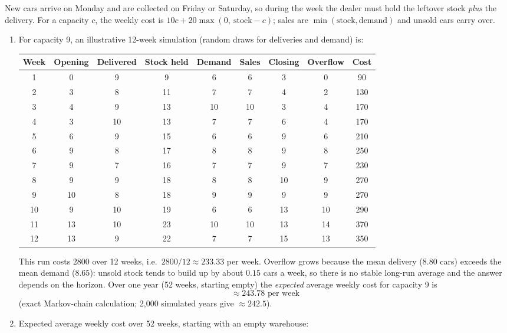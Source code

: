 \documentclass[11pt,a4paper]{article}
\begin{document}
New cars arrive on Monday and are collected on Friday or Saturday, so during the week the dealer must hold the leftover stock \emph{plus} the delivery. For a capacity $c$, the weekly cost is $10c + 20\max(0,\ \text{stock}-c)$; sales are $\min(\text{stock},\text{demand})$ and unsold cars carry over.

\begin{enumerate}
\item For capacity 9, an illustrative 12-week simulation (random draws for deliveries and demand) is:

\begin{center}
\begin{tabular}{ccccccccc}
\toprule
Week & Opening & Delivered & Stock held & Demand & Sales & Closing & Overflow & Cost \\
\midrule
1 & 0 & 9 & 9 & 6 & 6 & 3 & 0 & 90 \\
2 & 3 & 8 & 11 & 7 & 7 & 4 & 2 & 130 \\
3 & 4 & 9 & 13 & 10 & 10 & 3 & 4 & 170 \\
4 & 3 & 10 & 13 & 7 & 7 & 6 & 4 & 170 \\
5 & 6 & 9 & 15 & 6 & 6 & 9 & 6 & 210 \\
6 & 9 & 8 & 17 & 8 & 8 & 9 & 8 & 250 \\
7 & 9 & 7 & 16 & 7 & 7 & 9 & 7 & 230 \\
8 & 9 & 9 & 18 & 8 & 8 & 10 & 9 & 270 \\
9 & 10 & 8 & 18 & 9 & 9 & 9 & 9 & 270 \\
10 & 9 & 10 & 19 & 6 & 6 & 13 & 10 & 290 \\
11 & 13 & 10 & 23 & 10 & 10 & 13 & 14 & 370 \\
12 & 13 & 9 & 22 & 7 & 7 & 15 & 13 & 350 \\
\bottomrule
\end{tabular}
\end{center}

This run costs $2800$ over 12 weeks, i.e.\ $2800/12 \approx 233.33$ per week. Overflow grows because the mean delivery ($8.80$ cars) exceeds the mean demand ($8.65$): unsold stock tends to build up by about $0.15$ cars a week, so there is no stable long-run average and the answer depends on the horizon. Over one year (52 weeks, starting empty) the \emph{expected} average weekly cost for capacity 9 is
\[
\approx 243.78 \text{ per week}
\]
(exact Markov-chain calculation; 2,000 simulated years give $\approx 242.5$).

\item Expected average weekly cost over 52 weeks, starting with an empty warehouse:


\end{enumerate}
\end{document}
